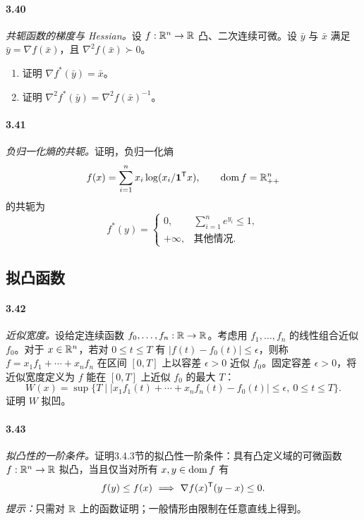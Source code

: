 \paragraph{3.40}\textit{共轭函数的梯度与 Hessian。}设 $f:\mathbb R^n\to\mathbb R$ 凸、二次连续可微。设 $\bar y$ 与 $\bar x$ 满足 $\bar y=\nabla f(\bar x)$，且 $\nabla^2f(\bar x)\succ0$。
\begin{enumerate}[label=(\alph*)]
\item 证明 $\nabla f^*(\bar y)=\bar x$。
\item 证明 $\nabla^2f^*(\bar y)=\nabla^2f(\bar x)^{-1}$。
\end{enumerate}
\paragraph{3.41}\textit{负归一化熵的共轭。}证明，负归一化熵
\[f(x)=\sum_{i=1}^n x_i\log(x_i/\mathbf 1^\mathsf T x),\qquad\operatorname{dom} f=\mathbb R_{++}^n\]
的共轭为
\[f^*(y)=\begin{cases}0,&\sum_{i=1}^n e^{y_i}\leq1,\\+\infty,&\text{其他情况}.\end{cases}\]
\subsection*{拟凸函数}
\paragraph{3.42}\textit{近似宽度。}设给定连续函数 $f_0,\ldots,f_n:\mathbb R\to\mathbb R$。考虑用 $f_1,\ldots,f_n$ 的线性组合近似 $f_0$。对于 $x\in\mathbb R^n$，若对 $0\leq t\leq T$ 有 $|f(t)-f_0(t)|\leq\epsilon$，则称 $f=x_1f_1+\cdots+x_nf_n$ 在区间 $[0,T]$ 上以容差 $\epsilon>0$ 近似 $f_0$。固定容差 $\epsilon>0$，将近似宽度定义为 $f$ 能在 $[0,T]$ 上近似 $f_0$ 的最大 $T$：
\[W(x)=\sup\{T\mid |x_1f_1(t)+\cdots+x_nf_n(t)-f_0(t)|\leq\epsilon,\ 0\leq t\leq T\}.\]
证明 $W$ 拟凹。
\paragraph{3.43}\textit{拟凸性的一阶条件。}证明3.4.3节的拟凸性一阶条件：具有凸定义域的可微函数 $f:\mathbb R^n\to\mathbb R$ 拟凸，当且仅当对所有 $x,y\in\operatorname{dom} f$ 有
\[f(y)\leq f(x)\ \Longrightarrow\ \nabla f(x)^\mathsf T(y-x)\leq0.\]
\textit{提示：}只需对 $\mathbb R$ 上的函数证明；一般情形由限制在任意直线上得到。
